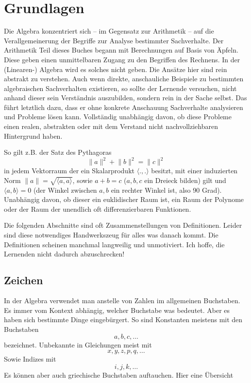 
\chapter{Grundlagen}

Die Algebra konzentriert sich -- im Gegensatz zur Arithmetik -- auf die Verallgemeinerung der Begriffe zur Analyse bestimmter Sachverhalte. Der Arithmetik Teil dieses Buches begann mit Berechnungen auf Basis von Äpfeln. Diese geben einen unmittelbaren Zugang zu den Begriffen des Rechnens. In der (Linearen-) Algebra wird es solches nicht geben. Die Ansätze hier sind rein abstrakt zu verstehen. Auch wenn direkte, anschauliche Beispiele zu bestimmten algebraischen Sachverhalten existieren, so sollte der Lernende versuchen, nicht anhand dieser sein Verständnis auszubilden, sondern rein in der Sache selbst. Das führt letztlich dazu, dass er ohne konkrete Anschauung Sachverhalte analysieren und Probleme lösen kann. Vollständig unabhängig davon, ob diese Probleme einen realen, abstrakten oder mit dem Verstand nicht nachvollziehbaren Hintergrund haben. 

So gilt z.B. der Satz des Pythagoras 
\[\lVert a\rVert ^2 +\lVert b\rVert ^2 = \lVert c\rVert^2\]
in jedem Vektorraum der ein Skalarprodukt $\langle .,.\rangle $ besitzt, mit einer induzierten Norm $\lVert a \rVert = \sqrt{\langle a,a\rangle} $, sowie $a+b=c$ ($a,b,c$ ein Dreieck bilden) gilt und $\langle a,b\rangle = 0 $ (der Winkel zwischen $a,b$ ein rechter Winkel ist, also 90 Grad). Unabhängig davon, ob dieser ein euklidischer Raum ist, ein Raum der Polynome oder der Raum der unendlich oft differenzierbaren Funktionen.

Die folgenden Abschnitte sind oft Zusammenstellungen von Definitionen. Leider sind diese notwendiges Handwerkszeug für alles was danach kommt. Die Definitionen scheinen manchmal langweilig und unmotiviert. Ich hoffe, die Lernenden nicht dadurch abzuschrecken!

\section{Zeichen}

In der Algebra verwendet man anstelle von Zahlen im allgemeinen Buchstaben. Es immer vom Kontext abhängig, welcher Buchstabe was bedeutet. Aber es haben sich bestimmte Dinge eingebürgert. So sind Konstanten meistens mit den Buchstaben
\[a, b, c, \dots \]
bezeichnet. Unbekannte in Gleichungen meist mit 
\[x, y, z, p, q, \dots \]
Sowie Indizes mit 
\[i, j, k, \dots \]
Es können aber auch griechische Buchstaben auftauchen. Hier eine Übersicht

